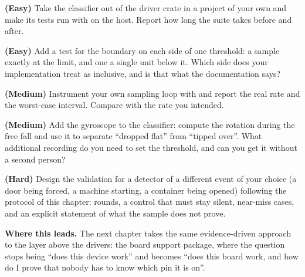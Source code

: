 \begin{exercises}
    \item \textbf{(Easy)} Take the classifier out of the driver crate in a project of your own
          and make its tests run with  on the host. Report how long the
          suite takes before and after.
    \item \textbf{(Easy)} Add a test for the boundary on each side of one threshold: a sample
          exactly at the limit, and one a single unit below it. Which side does your
          implementation treat as inclusive, and is that what the documentation says?
    \item \textbf{(Medium)} Instrument your own sampling loop with  and
          report the real rate and the worst-case interval. Compare with the rate you intended.
    \item \textbf{(Medium)} Add the gyroscope to the classifier: compute the rotation during the
          free fall and use it to separate ``dropped flat'' from ``tipped over''. What
          additional recording do you need to set the threshold, and can you get it without a
          second person?
    \item \textbf{(Hard)} Design the validation for a detector of a different event of your
          choice (a door being forced, a machine starting, a container being opened) following
          the protocol of this chapter: rounds, a control that must stay silent, near-miss
          cases, and an explicit statement of what the sample does not prove.
\end{exercises}

\begin{notebox}
    \textbf{Where this leads.} The next chapter takes the same evidence-driven approach to the
    layer above the drivers: the board support package, where the question stops being ``does
    this device work'' and becomes ``does this board work, and how do I prove that nobody has
    to know which pin it is on''.
\end{notebox}
